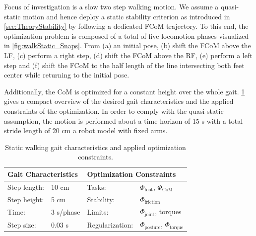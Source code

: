 Focus of investigation is a slow two step walking motion. We assume a quasi-static motion and hence deploy a static stability criterion as introduced in \cref{sec:TheoryStability} by following a dedicated \gls{FCoM} trajectory. To this end, the optimization problem is composed of a total of five locomotion phases visualized in \cref{fig:walkStatic_Snaps}. From (a) an initial pose, (b) shift the \gls{FCoM} above the \gls{LF}, (c) perform a right step, (d) shift the \gls{FCoM} above the \gls{RF}, (e) perform a left step and (f) shift the \gls{FCoM} to the half length of the line intersecting both feet center while returning to the initial pose.

Additionally, the \gls{CoM} is optimized for a constant height over the whole gait. \cref{tab:walkStatic} gives a compact overview of the desired gait characteristics and the applied constraints of the optimization. In order to comply with the quasi-static assumption, the motion is performed about a time horizon of 15 s with a total stride length of 20 cm a robot model with fixed arms. 
\begin{table}[t]
\centering
\caption[Static walking gait characteristics and optimization constraints]{Static walking gait characteristics and applied optimization constraints.}
\begin{tabular}{|ll|ll|}
\hline
\multicolumn{2}{|l|}{\textbf{Gait Characteristics}} & \multicolumn{2}{l|}{\textbf{Optimization Constraints}} \\ \hline
Step length:& 10 cm 	& Tasks: 			& $\Phi_{\text{foot}}$, $\Phi_{\text{CoM}}$\\ \hline
Step height:& 5 cm 	& Stability: 		& $\Phi_{\text{friction}}$\\ \hline
Time:& 3 s/phase 	& Limits: 			& $\Phi_{\text{joint}}$, torques \\ \hline
Step size:& 0.03 s	& Regularization: 	& $\Phi_{\text{posture}}$, $\Phi_{\text{torque}}$\\ \hline
\end{tabular}
\label{tab:walkStatic}
\end{table}

